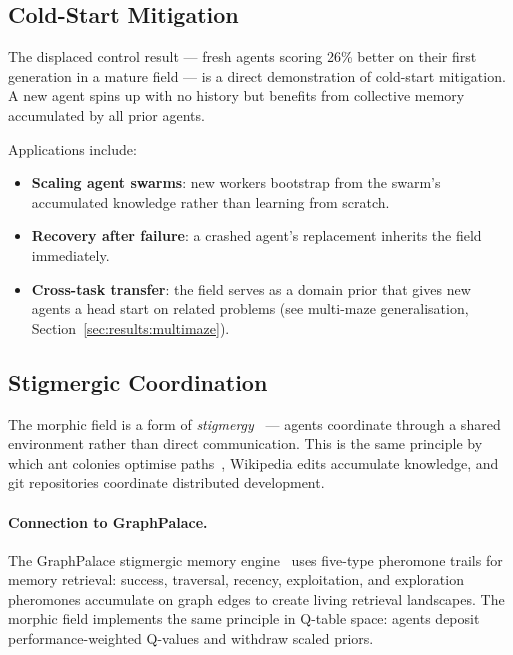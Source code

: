 \documentclass[twoside,11pt]{article}
\begin{document}
\subsection{Cold-Start Mitigation}
\label{sec:applications:coldstart}

The displaced control result --- fresh agents scoring 26\% better on their
first generation in a mature field --- is a direct demonstration of cold-start
mitigation.  A new agent spins up with no history but benefits from collective
memory accumulated by all prior agents.

Applications include:
\begin{itemize}[leftmargin=2em]
    \item \textbf{Scaling agent swarms}: new workers bootstrap from the
          swarm's accumulated knowledge rather than learning from scratch.
    \item \textbf{Recovery after failure}: a crashed agent's replacement
          inherits the field immediately.
    \item \textbf{Cross-task transfer}: the field serves as a domain prior
          that gives new agents a head start on related problems
          (see multi-maze generalisation, Section~\ref{sec:results:multimaze}).
\end{itemize}

\subsection{Stigmergic Coordination}
\label{sec:applications:stigmergy}

The morphic field is a form of \emph{stigmergy}~\citep{grasse1959} --- agents
coordinate through a shared environment rather than direct communication.
This is the same principle by which ant colonies optimise
paths~\citep{dorigo1996}, Wikipedia edits accumulate knowledge, and git
repositories coordinate distributed development.

\paragraph{Connection to GraphPalace.}
The GraphPalace stigmergic memory engine~\citep{graphpalace2026} uses
five-type pheromone trails for memory retrieval: success, traversal, recency,
exploitation, and exploration pheromones accumulate on graph edges to create
living retrieval landscapes.  The morphic field implements the same principle
in Q-table space: agents deposit performance-weighted Q-values and withdraw
scaled priors.
\end{document}
